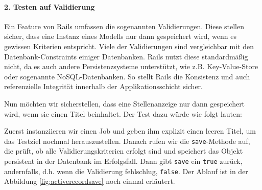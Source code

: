 \paragraph{2. Testen auf Validierung}

Ein Feature von Rails umfassen die sogenannten Validierungen. Diese stellen sicher, dass eine Instanz eines Modells nur dann gespeichert wird, wenn es gewissen Kriterien entspricht. Viele der Validierungen sind vergleichbar mit den Datenbank-Constraints einiger Datenbanken. Rails nutzt diese standardmäßig nicht, da es auch andere Persistenzsysteme unterstützt, wie z.B. Key-Value-Store oder sogenannte NoSQL-Datenbanken. So stellt Rails die Konsistenz und auch referenzielle Integrität innerhalb der Applikationsschicht sicher.

Nun möchten wir sicherstellen, dass eine Stellenanzeige nur dann gespeichert wird, wenn sie einen Titel beinhaltet. Der Test dazu würde wie folgt lauten:

\begin{ruby}[label={test/units/job\_test.rb}]
 

   
    
      
      
     
\end{ruby}
\tddred
Zuerst instanziieren wir einen Job und geben ihm explizit einen leeren Titel, um das Testziel nochmal herauszustellen. Danach rufen wir die \texttt{save}-Methode auf, die prüft, ob alle Validierungskriterien erfolgt sind und speichert das Objekt persistent in der Datenbank im Erfolgsfall. Dann gibt \texttt{save} ein \texttt{true} zurück, andernfalls, d.h. wenn die Validierung fehlschlug, \texttt{false}.
Der Ablauf ist in der Abbildung \ref{fig:activerecordsave} noch einmal erläutert.

